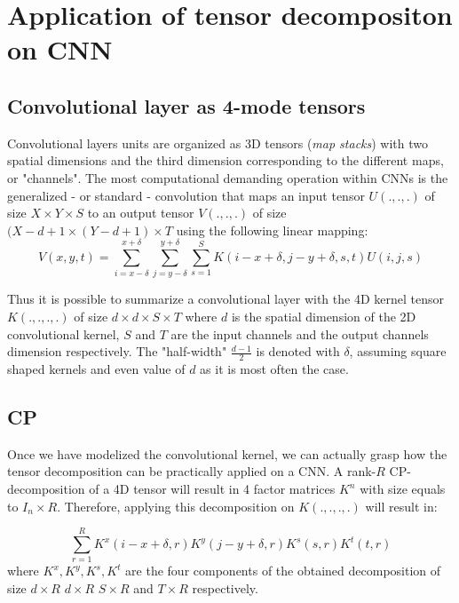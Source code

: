 \section{Application of tensor decompositon on CNN}
\label{sec:cpd-application}
\subsection{Convolutional layer as 4-mode tensors}
Convolutional layers units are organized as 3D tensors (\emph{map stacks}) with two spatial dimensions and the third dimension corresponding to the different maps, or "channels". The most computational demanding operation within CNNs is the generalized - or standard - convolution that maps an input tensor $U(.,.,.)$ of size $X \times Y \times S$ to an output tensor $V(.,.,.)$ of size $(X -d+1 \times (Y-d+1) \times T$ using the following linear mapping: 
\begin{equation}
\label{eq:convolution}
V(x, y, t)= \sum_{i=x-\delta}^{x+\delta} \sum_{j=y-\delta}^{y+\delta} \sum_{s=1}^S K(i-x+\delta, j-y +\delta,s,t) U(i,j,s) 
\end{equation}

Thus it is possible to summarize a convolutional layer with the 4D kernel tensor $K(.,.,.,.)$ of size $d \times d \times S \times T$ where $d$ is the spatial dimension of the 2D convolutional kernel, $S$ and $T$ are the input channels and the output channels dimension respectively. The "half-width" $\frac{d-1}{2}$ is denoted with $\delta$, assuming square shaped kernels and even value of $d$ as it is most often the case. 

\subsection{CP}
Once we have modelized the convolutional kernel, we can actually grasp how the tensor decomposition can be practically applied on a CNN. A rank-$R$ CP-decomposition of a 4D tensor will result in 4 factor matrices $K^n$ with size equals to $I_n \times R$. Therefore, applying this decomposition on $K(.,.,.,.)$ will result in: 

\begin{equation}
\label{eq:cpd-classic}
 \sum_{r=1}^R K^x(i-x+ \delta,r)K^y(j-y+ \delta,r)K^s(s,r)K^t(t,r) 
\end{equation}
where $K^x, K^y, K^s, K^t$ are the four components of the obtained decomposition of size $d\times R$ $d \times R$ $S \times R$ and $T \times R$ respectively. 

